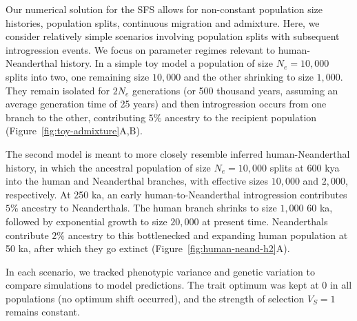 \documentclass{article}
\begin{document}
Our numerical solution for the SFS allows for non-constant population size
histories, population splits, continuous migration and admixture. Here, we
consider relatively simple scenarios involving population splits with
subsequent introgression events. We focus on parameter regimes relevant to
human-Neanderthal history. In a simple toy model a population of size
$N_e=10{,}000$ splits into two, one remaining size $10{,}000$ and the other
shrinking to size $1{,}000$. They remain isolated for $2N_e$ generations (or
500 thousand years, assuming an average generation time of 25 years) and then
introgression occurs from one branch to the other, contributing $5\%$ ancestry
to the recipient population (Figure~\ref{fig:toy-admixture}A,B).

The second model is meant to more closely resemble inferred human-Neanderthal
history, in which the ancestral population of size $N_e=10{,}000$ splits at 600
kya into the human and Neanderthal branches, with effective sizes $10{,}000$
and $2{,}000$, respectively. At 250 ka, an early human-to-Neanderthal
introgression contributes $5\%$ ancestry to Neanderthals. The human branch
shrinks to size $1{,}000$ 60 ka, followed by exponential growth to size
$20,000$ at present time. Neanderthals contribute $2\%$ ancestry to this
bottlenecked and expanding human population at 50 ka, after which they go
extinct (Figure~\ref{fig:human-neand-h2}A).

In each scenario, we tracked phenotypic variance and genetic variation to
compare simulations to model predictions. The trait optimum was kept at $0$ in
all populations (no optimum shift occurred), and the strength of selection
$V_S=1$ remains constant.
\end{document}
